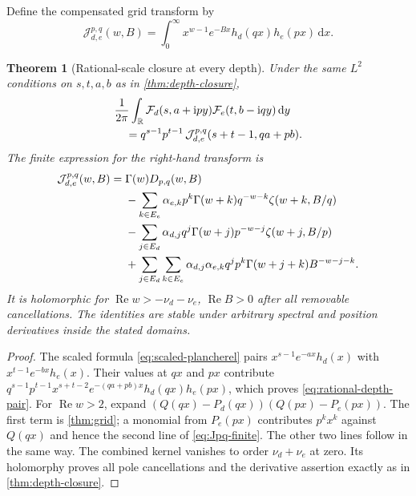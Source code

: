 \documentclass[11pt,a4paper]{article}
\newtheorem{theorem}{Theorem}[section]
\theoremstyle{definition}
\numberwithin{equation}{section}
\newcommand{\R}{\mathbb R}
\newcommand{\Rea}{\operatorname{Re}}
\newcommand{\dd}{\,\mathrm d}
\newcommand{\ii}{\mathrm i}
\begin{document}
Define the compensated grid transform by
\begin{equation}\label{eq:Jpq-integral}
 \mathcal J_{d,e}^{p,q}(w,B)=\int_0^\infty
             x^{w-1}e^{-Bx}h_d(qx)h_e(px)\dd x.
\end{equation}

\begin{theorem}[Rational-scale closure at every depth]
\label{thm:rational-depth}
Under the same $L^2$ conditions on $s,t,a,b$ as in
\cref{thm:depth-closure},
\begin{align}
 &\frac1{2\pi}\int_{\R}\mathcal F_d(s,a+\ii py)
                              \mathcal F_e(t,b-\ii qy)\dd y\notag\\
 &\quad=q^{s-1}p^{t-1}\,
       \mathcal J_{d,e}^{p,q}(s+t-1,qa+pb).
                          \label{eq:rational-depth-pair}
\end{align}
The finite expression for the right-hand transform is
\begin{align}
 \mathcal J_{d,e}^{p,q}(w,B)={}&\Gamma(w)D_{p,q}(w,B)\notag\\
 &-\sum_{k\in E_e}\alpha_{e,k}p^k\Gamma(w+k)q^{-w-k}
                                 \zeta(w+k,B/q)\notag\\
 &-\sum_{j\in E_d}\alpha_{d,j}q^j\Gamma(w+j)p^{-w-j}
                                 \zeta(w+j,B/p)\notag\\
 &+\sum_{j\in E_d}\sum_{k\in E_e}
       \alpha_{d,j}\alpha_{e,k}q^jp^k\Gamma(w+j+k)B^{-w-j-k}.
                          \label{eq:Jpq-finite}
\end{align}
It is holomorphic for $\Rea w>-\nu_d-\nu_e$, $\Rea B>0$ after all
removable cancellations. The identities are stable under arbitrary
spectral and position derivatives inside the stated domains.
\end{theorem}
\begin{proof}
The scaled formula \eqref{eq:scaled-plancherel} pairs
$x^{s-1}e^{-ax}h_d(x)$ with $x^{t-1}e^{-bx}h_e(x)$.
Their values at $qx$ and $px$ contribute
$q^{s-1}p^{t-1}x^{s+t-2}e^{-(qa+pb)x}h_d(qx)h_e(px)$,
which proves \eqref{eq:rational-depth-pair}.
For $\Rea w>2$, expand
$(Q(qx)-P_d(qx))(Q(px)-P_e(px))$.
The first term is \cref{thm:grid}; a monomial from $P_e(px)$ contributes
$p^kx^k$ against $Q(qx)$ and hence the second line of
\eqref{eq:Jpq-finite}. The other two lines follow in the same way.
The combined kernel vanishes to order $\nu_d+\nu_e$ at zero.
Its holomorphy proves all pole cancellations and the derivative assertion
exactly as in \cref{thm:depth-closure}.
\end{proof}
\end{document}
